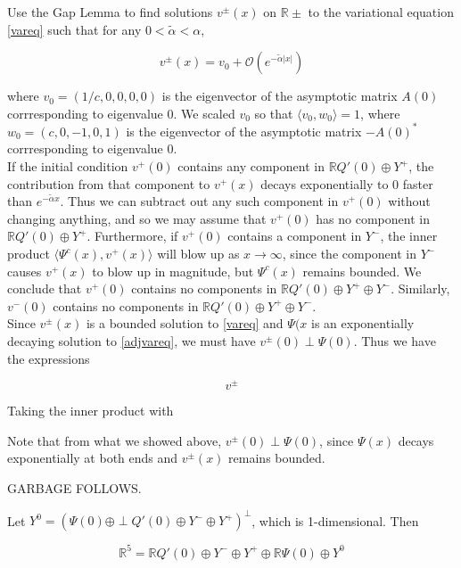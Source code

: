 \documentclass[12pt]{article}
\def\R{{\mathbb R}}
\begin{document}

Use the Gap Lemma to find solutions $v^\pm(x)$ on $\R \pm$ to the variational equation \eqref{vareq} such that for any $0 < \tilde{\alpha} < \alpha$,

\[
v^\pm(x) = v_0 + \mathcal{O}(e^{-\tilde{\alpha}|x|})
\]

where $v_0 = (1/c, 0, 0, 0, 0)$ is the eigenvector of the asymptotic matrix $A(0)$ corrresponding to eigenvalue 0. We scaled $v_0$ so that $\langle v_0, w_0 \rangle = 1$, where $w_0 = (c, 0, -1, 0, 1)$ is the eigenvector of the asymptotic matrix $-A(0)^*$ corrresponding to eigenvalue 0.\\

If the initial condition $v^+(0)$ contains any component in $\R Q'(0) \oplus Y^+$, the contribution from that component to $v^+(x)$ decays exponentially to 0 faster than $e^{-\tilde{\alpha}x}$. Thus we can subtract out any such component in $v^+(0)$ without changing anything, and so we may assume that $v^+(0)$ has no component in $\R Q'(0) \oplus Y^+$. Furthermore, if $v^+(0)$ contains a component in $Y^-$, the inner product $\langle \Psi^c(x), v^+(x) \rangle$ will blow up as $x \rightarrow \infty$, since the component in $Y^-$ causes $v^+(x)$ to blow up in magnitude, but $\Psi^c(x)$ remains bounded. We conclude that $v^+(0)$ contains no components in $\R Q'(0) \oplus Y^+ \oplus Y^-$. Similarly, $v^-(0)$ contains no components in $\R Q'(0) \oplus Y^+ \oplus Y^-$.\\

Since $v^\pm(x)$ is a bounded solution to \eqref{vareq} and $\Psi(x$ is an exponentially decaying solution to \eqref{adjvareq}, we must have $v^\pm(0) \perp \Psi(0)$. Thus we have the expressions

\[
v^\pm 
\]

Taking the inner product with 

Note that from what we showed above, $v^\pm(0) \perp \Psi(0)$, since $\Psi(x)$ decays exponentially at both ends and $v^\pm(x)$ remains bounded. 



GARBAGE FOLLOWS.

Let $Y^0 = (\Psi(0) \oplus \perp Q'(0) \oplus Y^- \oplus Y^+)^\perp$, which is 1-dimensional. Then 

\[
\R^5 = \R Q'(0) \oplus Y^- \oplus Y^+ \oplus \R \Psi(0) \oplus Y^0
\]
\end{document}
